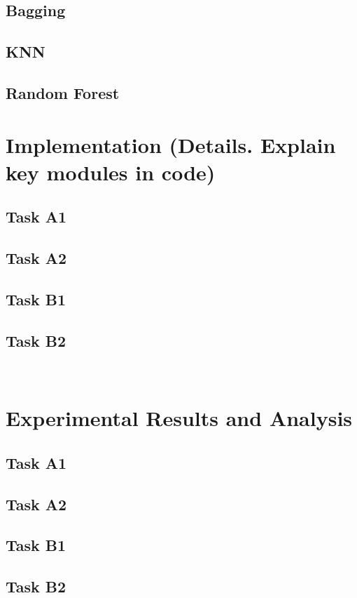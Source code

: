 \documentclass[a4paper,12pt,twoside,twocolumn]{article}
\begin{document}
\subsection{Bagging}
\label{sec:orgb4111cf}
\subsection{KNN}
\label{sec:org904e390}
\subsection{Random Forest}
\label{sec:orgfbfecb2}
\section{Implementation (Details. Explain key modules in code)}
\label{sec:orgc64c9e6}
\subsection{Task A1}
\label{sec:orgf7739c5}
\subsection{Task A2}
\label{sec:org6df76a1}
\subsection{Task B1}
\label{sec:org534e6b1}
\subsection{Task B2}
\label{sec:orgda896e5}
\pagebreak\\
\section{Experimental Results and Analysis}
\label{sec:org0d1b554}
\subsection{Task A1}
\label{sec:orga64e71a}
\subsection{Task A2}
\label{sec:org94ebfca}
\subsection{Task B1}
\label{sec:org73a22da}
\subsection{Task B2}
\label{sec:orgba0c434}
\end{document}
